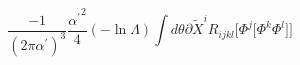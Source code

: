\begin{equation}
\frac{-1}{(2\pi\alpha^\prime)^3}\frac{{\alpha^\prime}^2}{4}(-\ln\Lambda)\int
d\theta\partial{\tilde X}^i R_{i j k
l}\lbrack\Phi^j\lbrack\Phi^k\Phi^l\rbrack\rbrack\label{RF4}
\end{equation}

